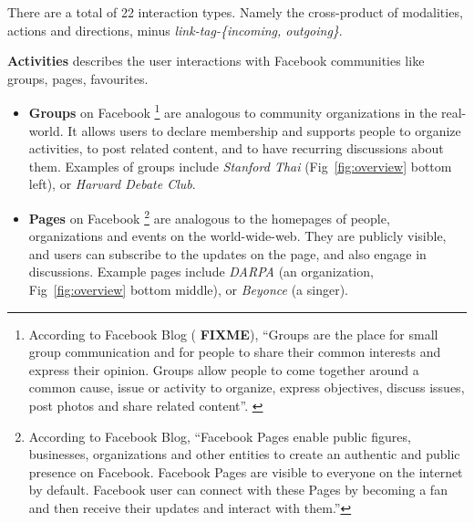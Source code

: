 There are a total of 22 interaction types. Namely the cross-product of modalities, actions and directions, minus {\em link-tag-\{incoming, outgoing\}}. 



{\bf Activities} describes the user interactions with Facebook communities like groups, pages, favourites.
\begin{itemize}
  \item \textbf{Groups} on Facebook 
\footnote{According to Facebook Blog ( {\bf FIXME}), ``Groups are the place for small group communication and for people to share their common interests and express their opinion. Groups allow people to come together around a common cause, issue or activity to organize, express objectives, discuss issues, post photos and share related content''. 
\label{fn:fbblog}}
are analogous to community organizations in the real-world. It allows users to declare membership and supports people to organize activities, to post related content, and to have recurring discussions about them.  Examples of groups include {\em Stanford Thai} (Fig~\ref{fig:overview} bottom left), or {\em Harvard Debate Club}.
  \item \textbf{Pages} on Facebook
  \footnote{According to Facebook Blog, ``Facebook Pages enable public figures, businesses, organizations and other entities to create an authentic and public presence on Facebook. Facebook Pages are visible to everyone on the internet by default. Facebook user can connect with these Pages by becoming a fan and then receive their updates and interact with them.'' }
  are analogous to the homepages of people, organizations and events on the world-wide-web. They are publicly visible, and users can subscribe to the updates on the page, and also engage in discussions. Example pages include {\em DARPA} (an organization, Fig~\ref{fig:overview} bottom middle), or {\em Beyonce} (a singer).


\end{itemize}
